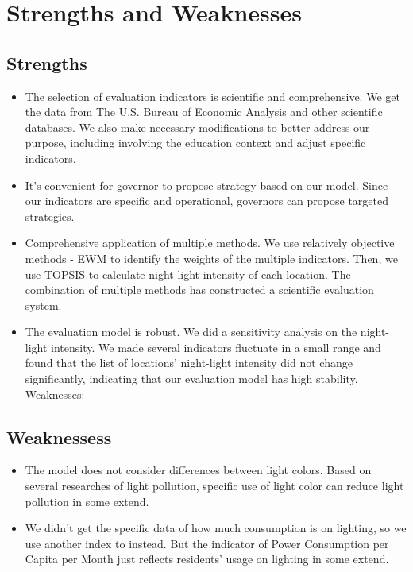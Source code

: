 \MinParskip{}

\section{Strengths and Weaknesses}
\subsection{Strengths}

\begin{itemize}
    \item The selection of evaluation indicators is scientific and comprehensive. We get the data from The U.S. Bureau of Economic Analysis and other scientific databases. We also make necessary modifications to better address our purpose, including involving the education context and adjust specific indicators.
    
    \item It's convenient for governor to propose strategy based on our model. Since our indicators are specific and operational, governors can propose targeted strategies. 
    
    \item Comprehensive application of multiple methods. We use relatively objective methods - EWM to identify the weights of the multiple indicators. Then, we use TOPSIS to calculate night-light intensity of each location. The combination of multiple methods has constructed a scientific evaluation system.
    
    \item The evaluation model is robust. We did a sensitivity analysis on the night-light intensity. We made several indicators fluctuate in a small range and found that the list of locations' night-light intensity did not change significantly, indicating that our evaluation model has high stability.
    Weaknesses:
\end{itemize}


\subsection{Weaknessess}
\begin{itemize}
    \item The model does not consider differences between light colors. Based on several researches of light pollution, specific use of light color can reduce light pollution in some extend.
    
    \item We didn't get the specific data of how much consumption is on lighting, so we use another index to instead. But the indicator of Power Consumption per Capita per Month just reflects residents' usage on lighting in some extend.
\end{itemize}
